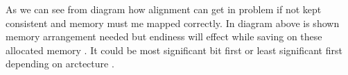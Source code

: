 \documentclass[11pt]{article} %
\begin{document}
As we can see from diagram how alignment can get in problem if not kept consistent and memory must me mapped correctly. In diagram above is shown memory arrangement needed but endiness will effect while saving on these allocated memory . It could be most significant bit first or least significant first depending on arctecture .
\end{document}
